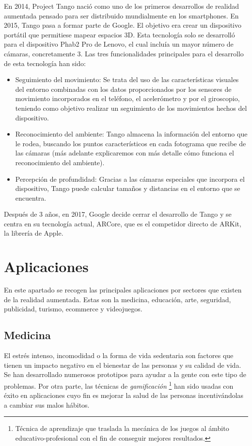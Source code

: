 En 2014, Project Tango nació como uno de los primeros desarrollos de realidad aumentada pensado para ser distribuido mundialmente en los smartphones. En 2015, Tango pasa a formar parte de Google. El objetivo era crear un dispositivo portátil que permitiese mapear espacios 3D. Esta tecnología solo se desarrolló para el dispositivo Phab2 Pro de Lenovo, el cual incluía un mayor número de cámaras, concretamente 3.
Las tres funcionalidades principales para el desarrollo de esta tecnología han sido:
\begin{itemize}
\item Seguimiento del movimiento: Se trata del uso de las características visuales del entorno combinadas con los datos proporcionados por los sensores de movimiento incorporados en el teléfono, el acelerómetro y por el giroscopio, teniendo como objetivo realizar un seguimiento de los movimientos hechos del dispositivo. 
\item Reconocimiento del ambiente: Tango almacena la información del entorno que le rodea, buscando los puntos característicos en cada fotograma que recibe de las cámaras (más adelante explicaremos con más detalle cómo funciona el reconocimiento del ambiente).
\item Percepción de profundidad: Gracias a las cámaras especiales que incorpora el dispositivo, Tango puede calcular tamaños y distancias en el entorno que se encuentra. 
\end{itemize}
Después de 3 años, en 2017, Google decide cerrar el desarrollo de Tango y se centra en su tecnología actual, ARCore, que es el competidor directo de ARKit, la librería de Apple.


\section{Aplicaciones}
En este apartado se recogen las principales aplicaciones por sectores que existen de la realidad aumentada. Estas son la medicina, educación, arte, seguridad, publicidad, turismo, ecommerce y videojuegos.\\
\subsection{Medicina}
El estrés intenso, incomodidad o la forma de vida sedentaria son factores que tienen un impacto negativo en el bienestar de las personas y su calidad de vida. Se han desarrollado numerosos prototipos para ayudar a la gente con este tipo de problemas. Por otra parte, las técnicas de \textit{gamificación} \footnote{ Técnica de aprendizaje que traslada la mecánica de los juegos al ámbito educativo-profesional con el fin de conseguir mejores resultados.} han sido usadas con éxito en aplicaciones cuyo fin es mejorar la salud de las personas incentivándolas a cambiar sus malos hábitos.\\

